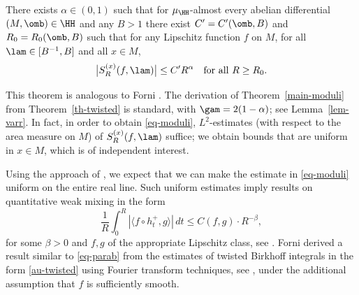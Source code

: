 \begin{theorem} \label{th-twisted}
There exists $\alpha\in (0,1)$ such that for $\mu_\HH$-almost every abelian differential $(M, \omb)\in \HH$ and any $B>1$ there exist $C'=C'(\omb,B)$ and $R_0 = R_0(\omb,B)$ such that for any Lipschitz function $f$ on $M$, for all $\lam\in [B^{-1},B]$ and all $x\in M$,
\begin{equation} \label{au-twisted}
\bigl|S_R^{(x)}(f,\lam)\bigr| \le C' R^\alpha\quad\text{for all }R\ge R_0.
\end{equation}
\end{theorem}

This theorem is analogous to Forni \cite[Th.\,1.6]{Forni2}.
The derivation of Theorem~\ref{main-moduli} from Theorem~\ref{th-twisted} is standard, with $\gam = 2(1-\alpha)$; see Lemma~\ref{lem-varr}. In fact, in order to obtain \eqref{eq-moduli}, $L^2$-estimates (with respect to
the area measure on $M$) of $S_R^{(x)}(f,\lam)$ suffice; we obtain bounds that are uniform in $x\in M$, which is of independent interest.

\begin{remark}
Using the approach of \cite{BuSo18b}, we expect that we can make the estimate in \eqref{eq-moduli} uniform
on the entire real line.
Such uniform estimates imply results on quantitative weak mixing in the form
\begin{equation} \label{eq-parab}
\frac{1}{R} \int_0^R \left|\langle f\circ h_t^+, g\rangle\right|\,dt \le C(f,g) \cdot R^{-\beta},
\end{equation}
for some $\beta>0$ and $f,g$ of the appropriate Lipschitz class, see \cite[Th.\,1.1]{BuSo18b}.
Forni \cite[Cor.\,1.8]{Forni2} derived a result similar to \eqref{eq-parab} from the estimates of twisted Birkhoff integrals in the form \eqref{au-twisted} using Fourier transform techniques, see
\cite[Lem.\,9.3]{Forni2}, under the additional assumption that $f$ is sufficiently smooth.
\end{remark}

